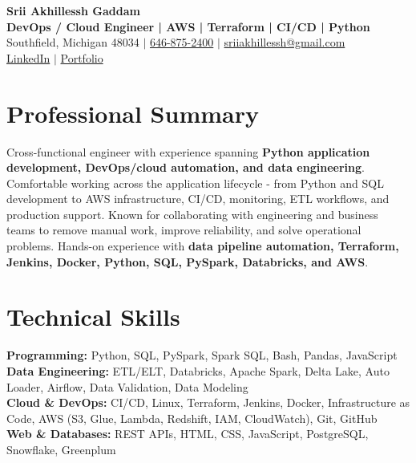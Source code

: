 \documentclass[letterpaper,10pt]{article}
\begin{document}
\fontsize{9.35pt}{10.45pt}\selectfont

\begin{center}
    {\LARGE \textbf{Srii Akhillessh Gaddam}} \\[-1pt]
    \textbf{DevOps / Cloud Engineer | AWS | Terraform | CI/CD | Python} \\[2pt]
    Southfield, Michigan 48034 $|$
    \href{tel:6468752400}{646-875-2400} $|$
    \href{mailto:sriiakhillessh@gmail.com}{sriiakhillessh@gmail.com} \\[1pt]
    \href{https://www.linkedin.com/in/srii-akhiilessh-gaddam-b48668191/}{LinkedIn} $|$
    \href{https://sriiakhillesshg.github.io/portfolio/}{Portfolio}
\end{center}
\vspace{-8pt}

\section{Professional Summary}
\small{Cross-functional engineer with experience spanning \textbf{Python application development, DevOps/cloud automation, and data engineering}. Comfortable working across the application lifecycle - from Python and SQL development to AWS infrastructure, CI/CD, monitoring, ETL workflows, and production support. Known for collaborating with engineering and business teams to remove manual work, improve reliability, and solve operational problems. Hands-on experience with \textbf{data pipeline automation, Terraform, Jenkins, Docker, Python, SQL, PySpark, Databricks, and AWS}.}

\section{Technical Skills}
\small{
\textbf{Programming:} Python, SQL, PySpark, Spark SQL, Bash, Pandas, JavaScript \\
\textbf{Data Engineering:} ETL/ELT, Databricks, Apache Spark, Delta Lake, Auto Loader, Airflow, Data Validation, Data Modeling \\
\textbf{Cloud \& DevOps:} CI/CD, Linux, Terraform, Jenkins, Docker, Infrastructure as Code, AWS (S3, Glue, Lambda, Redshift, IAM, CloudWatch), Git, GitHub \\
\textbf{Web \& Databases:} REST APIs, HTML, CSS, JavaScript, PostgreSQL, Snowflake, Greenplum
}
\end{document}
